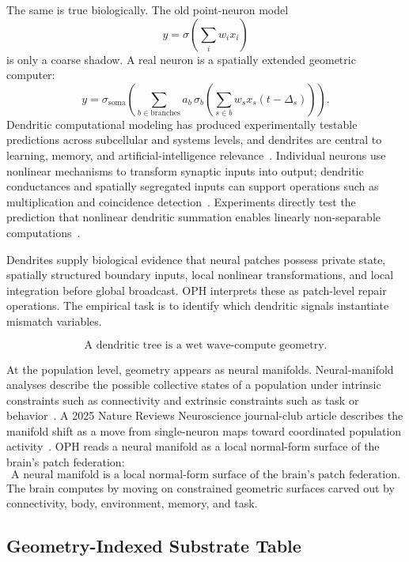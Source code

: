 \documentclass[11pt]{article}
\theoremstyle{remark}
\theoremstyle{plain}
\begin{document}
The same is true biologically. The old point-neuron model
\[
y=\sigma\!\left(\sum_i w_i x_i\right)
\]
is only a coarse shadow. A real neuron is a spatially extended geometric computer:
\[
y
=
\sigma_{\mathrm{soma}}
\left(
\sum_{b\in\mathrm{branches}}
a_b\,
\sigma_b
\left(
\sum_{s\in b}
w_s x_s(t-\Delta_s)
\right)
\right).
\]
Dendritic computational modeling has produced experimentally testable predictions across subcellular and systems levels, and dendrites are central to learning, memory, and artificial-intelligence relevance~\cite{PoiraziPapoutsi2020}. Individual neurons use nonlinear mechanisms to transform synaptic inputs into output; dendritic conductances and spatially segregated inputs can support operations such as multiplication and coincidence detection~\cite{Silver2010}. Experiments directly test the prediction that nonlinear dendritic summation enables linearly non-separable computations~\cite{Caze2024}.

Dendrites supply biological evidence that neural patches possess private state, spatially structured boundary inputs, local nonlinear transformations, and local integration before global broadcast. OPH interprets these as patch-level repair operations. The empirical task is to identify which dendritic signals instantiate mismatch variables.

\[
\boxed{
\text{A dendritic tree is a wet wave-compute geometry.}
}
\]

At the population level, geometry appears as neural manifolds. Neural-manifold analyses describe the possible collective states of a population under intrinsic constraints such as connectivity and extrinsic constraints such as task or behavior~\cite{Perich2025}. A 2025 Nature Reviews Neuroscience journal-club article describes the manifold shift as a move from single-neuron maps toward coordinated population activity~\cite{Gallego2025Manifolds}. OPH reads a neural manifold as a local normal-form surface of the brain's patch federation:
\[
\boxed{
\text{A neural manifold is a local normal-form surface of the brain's patch federation.}
}
\]
The brain computes by moving on constrained geometric surfaces carved out by connectivity, body, environment, memory, and task.

\subsection{Geometry-Indexed Substrate Table}
\end{document}
